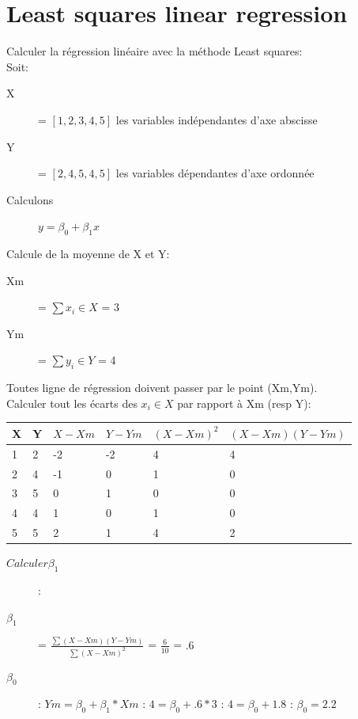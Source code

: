 \section{Least squares linear regression}
Calculer la régression linéaire avec la méthode Least squares:\\
Soit:
\begin{description}
\item[X] = $[1,2,3,4,5]$ les variables indépendantes d'axe abscisse
\item[Y] = $[2,4,5,4,5]$ les variables dépendantes d'axe ordonnée
\item[Calculons] $y = \beta_0 + \beta_1 x$
\end{description}
Calcule de la moyenne de X et Y:
\begin{description}
\item[Xm] = $ \sum x_i \in X$ = 3
\item[Ym] = $ \sum y_i \in Y$ = 4
\end{description}
Toutes ligne de régression doivent passer par le point (Xm,Ym).\\
Calculer tout les écarts des $x_i \in X$ par rapport à Xm (resp Y):\\

\begin{tabular}{ll|l|l|l|l}
  \hline
  X  & Y & $X - Xm$ & $Y - Ym$ & $(X-Xm)^2$ & $(X-Xm)(Y-Ym)$\\
  \hline
  1 & 2 & -2 & -2 & 4 & 4\\
  2 & 4 & -1 & 0  & 1 & 0\\
  3 & 5 & 0  & 1  & 0 & 0\\
  4 & 4 & 1  & 0  & 1 & 0\\
  5 & 5 & 2  & 1  & 4 & 2\\ 
  \hline
\end{tabular}

\begin{description}
\item[$Calculer \beta_1$]:
\item[$ \beta_1 $] = $ \frac{ \sum (X-Xm)(Y-Ym)}{ \sum (X-Xm)^2}$ = $\frac{6}{10}$ = $.6$
\item[$ \beta_0 $]: $Ym = \beta_0 + \beta_1 * Xm$ : $4 = \beta_0 + .6 * 3$ : $4= \beta_0 + 1.8$ : $\beta_0 = 2.2$
\end{description}
\pagebreak
